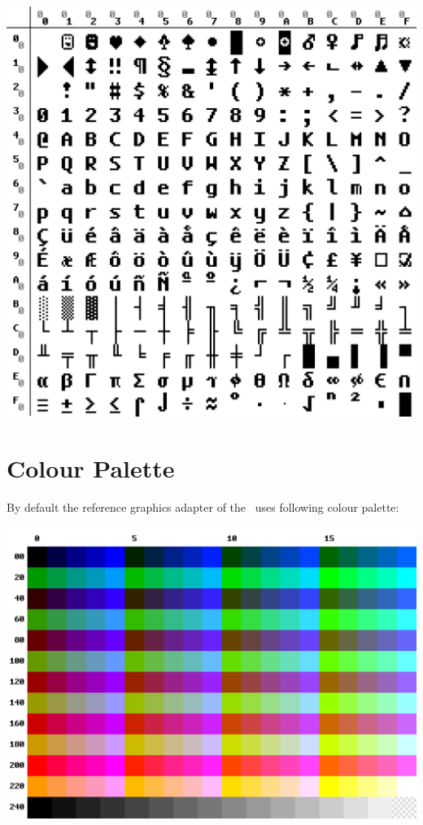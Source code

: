 {\centering
\includegraphics[width=\linewidth]{tsvmcp.png}
\label{fig:codepage}
}
\newpage

\section{Colour Palette}
\label{colourpalette}

By default the reference graphics adapter of the \thismachine\ uses following colour palette:

{\centering
\includegraphics[width=\linewidth]{tsvmpal.png}
\label{fig:codepage}
}

